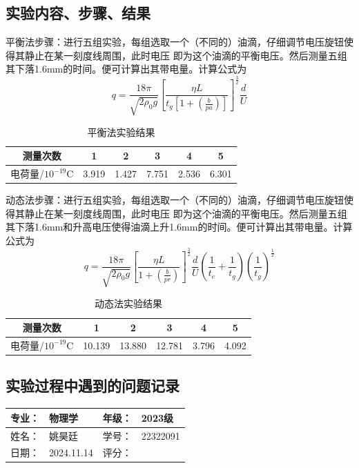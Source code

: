 \documentclass[dvipsnames, svgnames,a4paper,11pt]{article}
\begin{document}
\subsection{实验内容、步骤、结果}
平衡法步骤：进行五组实验，每组选取一个（不同的）油滴，仔细调节电压旋钮使得其静止在某一刻度线周围，此时电压
即为这个油滴的平衡电压。然后测量五组其下落1.6mm的时间。便可计算出其带电量。计算公式为
$$q=\frac{18\pi}{\sqrt{2\rho_0g}}[\frac{\eta L}{t_g[1+(\frac{b}{pa})]}]^\frac{3}{2}\frac{d}{U}$$
\begin{table}[H]
	\centering
	\begin{tabular}{cccccc}
		\toprule
		测量次数& 1 & 2 & 3&4&5\\
		\midrule
		电荷量/$10^{-19}$C & 3.919&1.427 & 7.751&2.536&6.301 \\
		\bottomrule
	\end{tabular}
	 \caption{平衡法实验结果}
\end{table}
动态法步骤：进行五组实验，每组选取一个（不同的）油滴，仔细调节电压旋钮使得其静止在某一刻度线周围，此时电压
即为这个油滴的平衡电压。然后测量五组其下落1.6mm和升高电压使得油滴上升1.6mm的时间。便可计算出其带电量。计算公式为
$$q=\frac{18\pi}{\sqrt{2\rho_0g}}[\frac{\eta L}{1+(\frac{b}{pr})}]^\frac{3}{2}\frac{d}{U}(\frac{1}{t_e}+\frac{1}{t_g})(\frac{1}{t_g})^\frac{1}{2}$$
\begin{table}[H]
	\centering
	\begin{tabular}{cccccc}
		\toprule
		测量次数& 1 & 2 & 3&4&5\\
		\midrule
		电荷量/$10^{-19}$C & 10.139&13.880 & 12.781&3.796&4.092 \\
		\bottomrule
	\end{tabular}
	 \caption{动态法实验结果}
\end{table}
\subsection{实验过程中遇到的问题记录}



\clearpage
{}
\begin{table}
	\renewcommand\arraystretch{1.7}
	\begin{tabularx}{\textwidth}{|X|X|X|X|}
	\hline
	专业：& 物理学 &年级：& 2023级\\
	\hline
	姓名： &姚昊廷& 学号：&22322091 \\
	\hline
    日期：&2024.11.14 & 评分： &\\
	\hline
	\end{tabularx}
\end{table}
\end{document}
